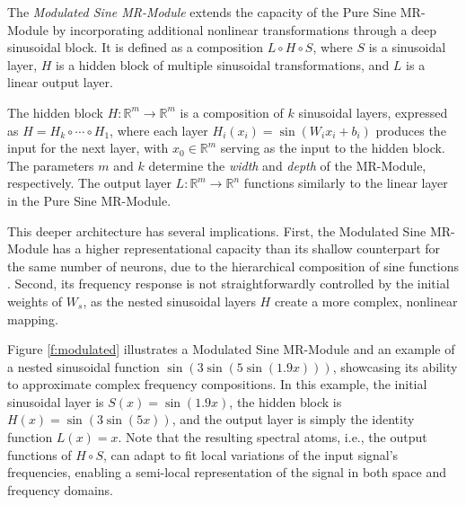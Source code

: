 The \textit{Modulated Sine MR-Module} extends the capacity of the Pure Sine MR-Module by incorporating additional nonlinear transformations through a deep sinusoidal block. It is defined as a composition \( L \circ H \circ S \), where \( S \) is a sinusoidal layer, \( H \) is a hidden block of multiple sinusoidal transformations, and \( L \) is a linear output layer.


The hidden block \( H\!:\!\mathbb{R}^m\!\to\! \mathbb{R}^m \) is a composition of \( k \) sinusoidal layers, expressed as \( H = H_k \circ \cdots \circ H_1 \), where each layer \( H_i(x_i) = \sin\left(W_i x_i + b_i\right) \) produces the input for the next layer, with \( x_0 \in \mathbb{R}^m \) serving as the input to the hidden block. The parameters \( m \) and \( k \) determine the \textit{width} and \textit{depth} of the MR-Module, respectively. The output layer \( L \!:\! \mathbb{R}^m \!\to\! \mathbb{R}^n \) functions similarly to the linear layer in the Pure Sine MR-Module.

This deeper architecture has several implications. First, the Modulated Sine MR-Module has a higher representational capacity than its shallow counterpart for the same number of neurons, due to the hierarchical composition of sine functions \citep{novello2022understanding}. Second, its frequency response is not straightforwardly controlled by the initial weights of \( W_s \), as the nested sinusoidal layers \( H \) create a more complex, nonlinear mapping.


Figure \ref{f:modulated} illustrates a Modulated Sine MR-Module and an example of a nested sinusoidal function \( \sin\left( 3\sin\left(5\sin(1.9x)\right)\right) \), showcasing its ability to approximate complex frequency compositions. In this example, the initial sinusoidal layer is \( S(x) = \sin(1.9 x) \), the hidden block is \( H(x) = \sin\left(3\sin(5x)\right) \), and the output layer is simply the identity function \( L(x) = x \). Note that the resulting spectral atoms, i.e., the output functions of \( H \circ S \), can adapt to fit local variations of the input signal's frequencies, enabling a semi-local representation of the signal in both space and frequency domains.

